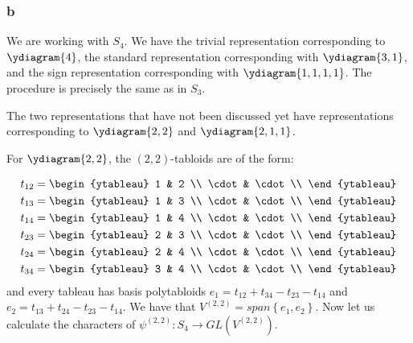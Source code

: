 \documentclass[]{article}
\begin{document}
\subsubsection*{b}
We are working with $S_4$.
We have the trivial representation corresponding to $\ydiagram{4}$, the standard representation corresponding with $\ydiagram{3, 1}$, and the sign representation corresponding with $\ydiagram{1, 1, 1, 1}$. The procedure is precisely the same as in $S_3$. 

The two representations that have not been discussed yet have representations corresponding to $\ydiagram{2, 2}$ and $\ydiagram{2, 1, 1}$. 

For $\ydiagram{2, 2}$, the $(2, 2)$-tabloids are of the form:

\begin{align*}
	t_{12} &= \begin{ytableau}
	1 & 2 \\
	\cdot & \cdot \\
	\end{ytableau}\\
	t_{13} &= \begin{ytableau}
	1 & 3 \\
	\cdot & \cdot \\
	\end{ytableau}\\
	t_{14} &= \begin{ytableau}
	1 & 4 \\
	\cdot & \cdot \\
\end{ytableau}\\
	t_{23} &= \begin{ytableau}
	2 & 3 \\
	\cdot & \cdot \\
\end{ytableau}\\
	t_{24} &= \begin{ytableau}
	2 & 4 \\
	\cdot & \cdot \\
\end{ytableau}\\
	t_{34} &= \begin{ytableau}
	3 & 4 \\
	\cdot & \cdot \\
\end{ytableau}\\
\end{align*}
and every tableau has basis polytabloids $e_1 = t_{12} + t_{34} - t_{23} - t_{14}$ and $e_2 = t_{13} + t_{24} - t_{23} - t_{14}$. 
We have that $V^{(2,2)} = span\left\{{e_1, e_2}\right\}$. Now let us calculate the characters of $\psi^{(2,2)}: S_4 \rightarrow GL(V^{(2,2)})$.
\end{document}
